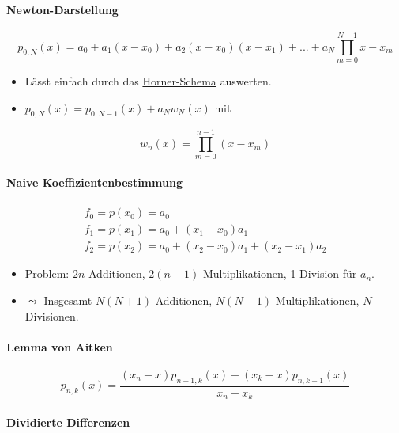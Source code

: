 \documentclass[a4paper, 14pt]{article}
\begin{document}
	\paragraph{Newton-Darstellung}

	\begin{equation}
		p_{0, N}(x) = a_0 + a_1 (x - x_0) + a_2 (x - x_0) (x - x_1) + ... + a_N \prod_{m = 0}^{N - 1}{x - x_m}
	\end{equation}

	\begin{itemize}
		\item Lässt einfach durch das \href{https://de.wikipedia.org/wiki/Horner-Schema}{Horner-Schema} auswerten.
		\item $p_{0, N}(x) = p_{0, N - 1}(x) + a_N w_N(x)$ mit
	\end{itemize}

	\begin{equation}
		w_n(x) = \prod_{m = 0}^{n - 1}{(x - x_m)}
	\end{equation}

	\paragraph{Naive Koeffizientenbestimmung}
	
	\begin{eqnarray}
		f_0 = p(x_0) = a_0 \\
		f_1 = p(x_1) = a_0 + (x_1 - x_0) a_1 \\
		f_2 = p(x_2) = a_0 + (x_2 - x_0) a_1 + (x_2 - x_1) a_2
	\end{eqnarray}
	
	\begin{itemize}
		\item Problem: $2n$ Additionen, $2(n - 1)$ Multiplikationen, 1 Division für $a_n$.
		\item $\leadsto$ Insgesamt $N(N + 1)$ Additionen, $N(N - 1)$ Multiplikationen, $N$ Divisionen.
	\end{itemize}

	\paragraph{Lemma von Aitken}

	\begin{equation}
		p_{n, k}(x) = \frac{(x_n - x) p_{n + 1, k}(x) - (x_k - x) p_{n, k - 1}(x)}{x_n - x_k}
	\end{equation}

	\paragraph{Dividierte Differenzen}
\end{document}
